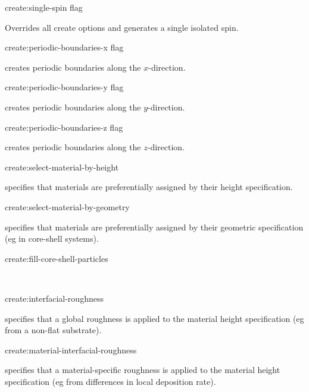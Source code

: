 {\zicf create:single-spin flag} Overrides all create options and generates a single isolated spin.\\ \par

{\zicf create:periodic-boundaries-x flag} creates periodic boundaries along the $x$-direction.\\ \par

{\zicf create:periodic-boundaries-y flag} creates periodic boundaries along the $y$-direction.\\ \par

{\zicf create:periodic-boundaries-z flag} creates periodic boundaries along the $z$-direction.\\ \par

{\zicf create:select-material-by-height} specifies that materials are preferentially assigned by their height specification.\\ \par

{\zicf create:select-material-by-geometry} specifies that materials are preferentially assigned by their geometric specification (eg in core-shell systems).\\ \par

{\zicf create:fill-core-shell-particles}\\ \par

{\zicf create:interfacial-roughness} specifies that a global roughness is applied to the material height specification (eg from a non-flat substrate).\\ \par

{\zicf create:material-interfacial-roughness} specifies that a material-specific roughness is applied to the material height specification (eg from differences in local deposition rate).\\ \par

